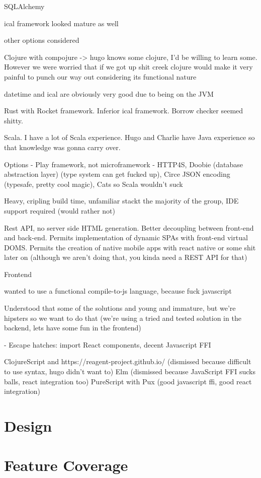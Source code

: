 \documentclass[11pt,a4paper]{report}
\begin{document}
SQLAlchemy

ical framework looked mature as well

other options considered


Clojure with compojure -> hugo knows some clojure, I'd be willing to learn some. However we were worried that if we got up shit creek clojure would make it very painful to punch our way out considering its functional nature

datetime and ical are obviously very good due to being on the JVM


Rust with Rocket framework. Inferior ical framework. Borrow checker seemed shitty.

Scala. I have a lot of Scala experience. Hugo and Charlie have Java experience so that knowledge was gonna carry over.

Options - Play framework, not microframework
- HTTP4S, Doobie (database abstraction layer) (type system can get fucked up), Circe JSON encoding (typesafe, pretty cool magic), Cats so Scala wouldn't suck

Heavy, cripling build time, unfamiliar stackt the majority of the group, IDE support required (would rather not)




Rest API, no server side HTML generation. Better decoupling between front-end and back-end. Permits implementation of dynamic SPAs with front-end virtual DOMS. Permits the creation of native mobile apps with react native or some shit later on (although we aren't doing that, you kinda need a REST API for that)

Frontend

wanted to use a functional compile-to-js language, because fuck javascript

Understood that some of the solutions and young and immature, but we're hipsters so we want to do that (we're using a tried and tested solution in the backend, lets have some fun in the frontend)

- Escape hatches: import React components, decent Javascript FFI

ClojureScript and https://reagent-project.github.io/ (dismissed because difficult to use syntax, hugo didn't want to)
Elm (dismissed because JavaScript FFI sucks balls, react integration too)
PureScript with Pux (good javascript ffi, good react integration)


\chapter{Design}

\chapter{Feature Coverage}



\end{document}
